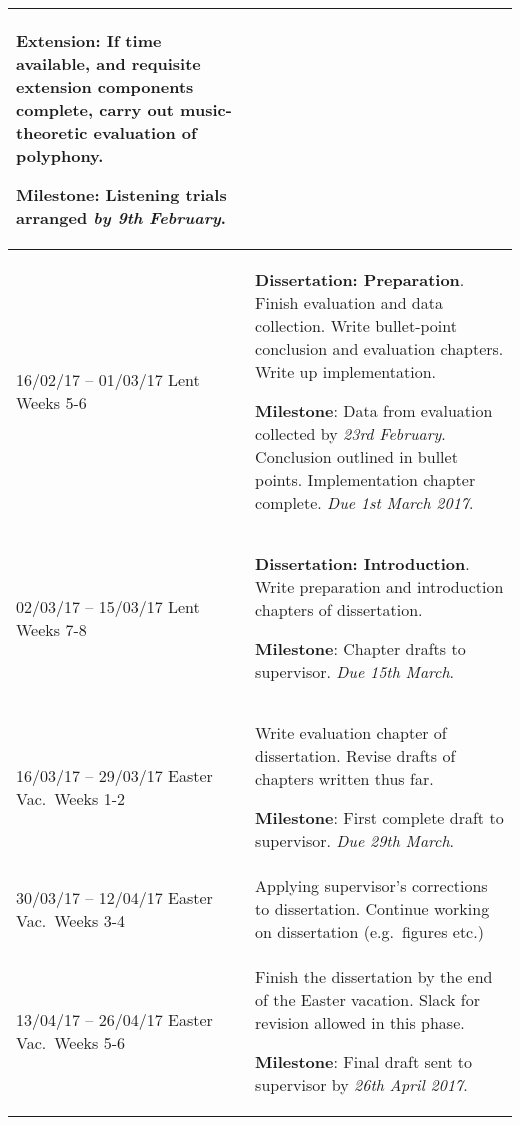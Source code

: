 \documentclass[12pt,a4paper,twoside]{article}
\begin{document}
\begin{longtable}{ p{4cm} | p{11cm} }
\textbf{Extension}: If time available, and requisite extension components
complete, carry out music-theoretic evaluation of polyphony.
\newline\vspace{0mm}

\textbf{Milestone}: Listening trials arranged \emph{by 9th February}.
\\ \hline

16/02/17 -- 01/03/17 Lent Weeks 5-6 & \textbf{Dissertation: Preparation}.
Finish evaluation and data collection. Write bullet-point conclusion and 
evaluation chapters. Write up implementation. \newline\vspace{0mm}

\textbf{Milestone}: Data from evaluation collected by \emph{23rd February}.
Conclusion outlined in bullet points. Implementation chapter
complete. \emph{Due 1st March 2017}.
\\ \hline

02/03/17 -- 15/03/17 Lent Weeks 7-8 & \textbf{Dissertation: Introduction}.
Write preparation and introduction chapters of dissertation.
\newline\vspace{0mm}

\textbf{Milestone}: Chapter drafts to supervisor. \emph{Due 15th March}.
\\ \hline

16/03/17 -- 29/03/17 Easter Vac.\ Weeks 1-2 & Write evaluation chapter of
dissertation. Revise drafts of chapters written thus far. \newline\vspace{0mm}

\textbf{Milestone}: First complete draft to supervisor. \emph{Due 29th March}.
\\ \hline

30/03/17 -- 12/04/17 Easter Vac.\ Weeks 3-4 & 
Applying supervisor's corrections to dissertation. Continue working on
dissertation (e.g.\ figures etc.)
\\ \hline

13/04/17 -- 26/04/17 Easter Vac.\ Weeks 5-6 & 
Finish the dissertation by the end of the Easter vacation. Slack for revision
allowed in this phase. \newline\vspace{0mm}

\textbf{Milestone}: Final draft sent to supervisor by \emph{26th April 2017}.
\\ \hline
\end{longtable}

\printbibliography
\end{document}
